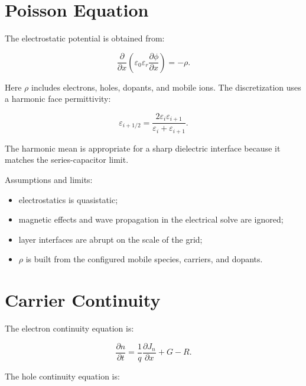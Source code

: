\documentclass[
  11pt,
  american,
]{report}
\providecommand{\tightlist}{%
  \setlength{\itemsep}{0pt}\setlength{\parskip}{0pt}}
\begin{document}
\hypertarget{poisson-equation}{%
\section{Poisson Equation}\label{poisson-equation}}

The electrostatic potential is obtained from:

\begin{equation}
\label{eq:poisson}
\frac{\partial}{\partial x}
\left(
\varepsilon_0 \varepsilon_r
\frac{\partial \phi}{\partial x}
\right)
= -\rho .
\end{equation}

Here \(\rho\) includes electrons, holes, dopants, and mobile ions. The
discretization uses a harmonic face permittivity:

\begin{equation}
\label{eq:harmonic-eps}
\varepsilon_{i+1/2}
=
\frac{2\varepsilon_i\varepsilon_{i+1}}
{\varepsilon_i+\varepsilon_{i+1}} .
\end{equation}

The harmonic mean is appropriate for a sharp dielectric interface
because it matches the series-capacitor limit.

Assumptions and limits:

\begin{itemize}
\tightlist
\item
  electrostatics is quasistatic;
\item
  magnetic effects and wave propagation in the electrical solve are
  ignored;
\item
  layer interfaces are abrupt on the scale of the grid;
\item
  \(\rho\) is built from the configured mobile species, carriers, and
  dopants.
\end{itemize}

\hypertarget{carrier-continuity}{%
\section{Carrier Continuity}\label{carrier-continuity}}

The electron continuity equation is:

\begin{equation}
\label{eq:electron-continuity}
\frac{\partial n}{\partial t}
=
\frac{1}{q}\frac{\partial J_n}{\partial x}
+G-R .
\end{equation}

The hole continuity equation is:
\end{document}
